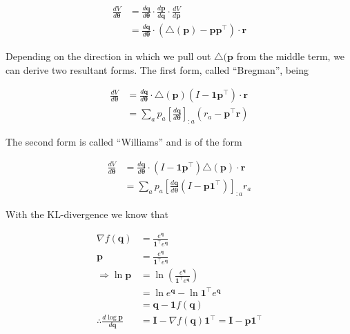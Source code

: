 \documentclass[10pt]{article}
\theoremstyle{definition}
\begin{document}
\begin{equation*}
\begin{aligned}
\frac{dV}{d\pmb{\theta}} & = \frac{d\mathbf{q}}{d\pmb{\theta}} \cdot \frac{d\mathbf{p}}{d\mathbf{q}} \cdot \frac{dV}{d\mathbf{p}} \\
& = \frac{d\mathbf{q}}{d\pmb{\theta}} \cdot (\triangle(\mathbf{p}) - \mathbf{p}\mathbf{p}^\top) \cdot \mathbf{r}
\end{aligned}
\end{equation*}

\noindent
Depending on the direction in which we pull out $\triangle(\mathbf{p}$ from the middle term, we can derive two resultant forms. The first form, called ``Bregman'', being

\begin{equation*}
\begin{aligned}
\frac{dV}{d\pmb{\theta}} & = \frac{d\mathbf{q}}{d\pmb{\theta}} \cdot \triangle(\mathbf{p}) (I - \mathbf{1}\mathbf{p}^\top) \cdot \mathbf{r} \\
& = \sum_a p_a \left[\frac{d\mathbf{q}}{d\pmb{\theta}}\right]_{:a}(r_a - \mathbf{p}^\top \mathbf{r})
\end{aligned}
\end{equation*}

\noindent 
The second form is called ``Williams'' and is of the form

\begin{equation*}
\begin{aligned}
\frac{dV}{d\pmb{\theta}} & = \frac{d\mathbf{q}}{d\pmb{\theta}} \cdot (I - \mathbf{1}\mathbf{p}^\top) \triangle(\mathbf{p}) \cdot \mathbf{r} \\
& = \sum_a p_a \left[\frac{d\mathbf{q}}{d\pmb{\theta}}(I - \mathbf{p}\mathbf{1}^\top)\right]_{:a}r_a
\end{aligned}
\end{equation*}

\noindent
With the KL-divergence we know that

\begin{equation*}
\begin{aligned}
\nabla f(\mathbf{q}) & = \frac{e^{\mathbf{q}}}{\mathbf{1}^\top e^{\mathbf{q}}} \\
\mathbf{p} & = \frac{e^{\mathbf{q}}}{\mathbf{1}^\top e^{\mathbf{q}}} \\
\Rightarrow \ln\mathbf{p} & = \ln\left(\frac{e^{\mathbf{q}}}{\mathbf{1}^\top e^{\mathbf{q}}}\right) \\
& = \ln e^{\mathbf{q}} - \ln\mathbf{1}^\top e^{\mathbf{q}} \\
& = \mathbf{q} - \mathbf{1}f(\mathbf{q}) \\
\therefore \frac{d\log\mathbf{p}}{d\mathbf{q}} & = \mathbf{I} - \nabla f(\mathbf{q})\mathbf{1}^\top = \mathbf{I} - \mathbf{p}\mathbf{1}^\top 
\end{aligned}
\end{equation*}
\end{document}
